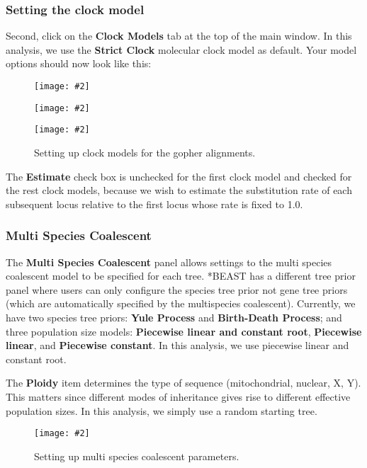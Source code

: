 \documentclass{article}
\newcommand{\includeimage}[2][]{%
\texttt{[image: \#2]}
}
\begin{document}
\subsubsection*{Setting the clock model}

Second, click on the {\bf Clock Models} tab at the top of the
main window. In this analysis, we use the \textbf{Strict Clock} molecular clock model as default.
Your model options should now look like this: 

\begin{figure}
\centering
\includeimage[scale=0.3,clip=true,trim=0 450 0 0]{figures/BEAUti_ClockModel1}

\centering
\includeimage[scale=0.3,clip=true,trim=0 450 0 0]{figures/BEAUti_ClockModel2}

\centering
\includeimage[scale=0.3,clip=true,trim=0 450 0 0]{figures/BEAUti_ClockModel3}

\caption{\label{fig.clockmodel} Setting up clock models for the gopher alignments.}
\end{figure}


The \textbf{Estimate} check box is unchecked for the first clock model and checked for the rest clock models, because we wish to estimate the substitution rate of each subsequent locus relative to the first locus whose rate is fixed to 1.0. 

\subsubsection*{Multi Species Coalescent}

The {\bf Multi Species Coalescent} panel allows settings to the multi species coalescent model to be specified for each tree. *BEAST has a different tree prior panel where users can only configure the species tree prior not gene tree priors (which are automatically specified by the multispecies coalescent). Currently, we have two species tree priors: \textbf{Yule Process} and \textbf{Birth-Death Process}; and three population size models: \textbf{Piecewise linear and constant root}, \textbf{Piecewise linear}, and \textbf{Piecewise constant}. 
In this analysis, we use {piecewise linear and constant root}.

The \textbf{Ploidy} item determines the type of sequence (mitochondrial, nuclear, X, Y). This matters since different modes of inheritance gives rise to different effective population sizes. In this analysis, we simply use a random starting tree. 

\begin{figure}
\centering
\includeimage[scale=0.3,clip=true,trim=0 150 0 0]{figures/BEAUti_MSP}

\caption{\label{fig.MSP} Setting up multi species coalescent parameters.}
\end{figure}
\end{document}
